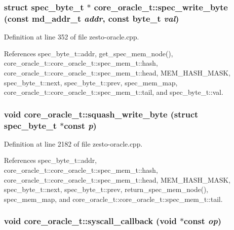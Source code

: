 \subsubsection[{spec\_\-write\_\-byte}]{\setlength{\rightskip}{0pt plus 5cm}struct {\bf spec\_\-byte\_\-t} $\ast$ core\_\-oracle\_\-t::spec\_\-write\_\-byte (const {\bf md\_\-addr\_\-t} {\em addr}, \/  const {\bf byte\_\-t} {\em val})\hspace{0.3cm}{\tt  [read]}}\label{classcore__oracle__t_f60392fcde2b50e69bf96ef7fa845463}




Definition at line 352 of file zesto-oracle.cpp.

References spec\_\-byte\_\-t::addr, get\_\-spec\_\-mem\_\-node(), core\_\-oracle\_\-t::core\_\-oracle\_\-t::spec\_\-mem\_\-t::hash, core\_\-oracle\_\-t::core\_\-oracle\_\-t::spec\_\-mem\_\-t::head, MEM\_\-HASH\_\-MASK, spec\_\-byte\_\-t::next, spec\_\-byte\_\-t::prev, spec\_\-mem\_\-map, core\_\-oracle\_\-t::core\_\-oracle\_\-t::spec\_\-mem\_\-t::tail, and spec\_\-byte\_\-t::val.
\subsubsection[{squash\_\-write\_\-byte}]{\setlength{\rightskip}{0pt plus 5cm}void core\_\-oracle\_\-t::squash\_\-write\_\-byte (struct {\bf spec\_\-byte\_\-t} $\ast$const  {\em p})\hspace{0.3cm}{\tt  [protected]}}\label{classcore__oracle__t_e14bba8a8cf6ecfc9a52845e3c1760aa}




Definition at line 2182 of file zesto-oracle.cpp.

References spec\_\-byte\_\-t::addr, core\_\-oracle\_\-t::core\_\-oracle\_\-t::spec\_\-mem\_\-t::hash, core\_\-oracle\_\-t::core\_\-oracle\_\-t::spec\_\-mem\_\-t::head, MEM\_\-HASH\_\-MASK, spec\_\-byte\_\-t::next, spec\_\-byte\_\-t::prev, return\_\-spec\_\-mem\_\-node(), spec\_\-mem\_\-map, and core\_\-oracle\_\-t::core\_\-oracle\_\-t::spec\_\-mem\_\-t::tail.
\subsubsection[{syscall\_\-callback}]{\setlength{\rightskip}{0pt plus 5cm}void core\_\-oracle\_\-t::syscall\_\-callback (void $\ast$const  {\em op})\hspace{0.3cm}{\tt  [static, protected]}}\label{classcore__oracle__t_0f8c8d4e3eb748b911028d64d2a086d8}




